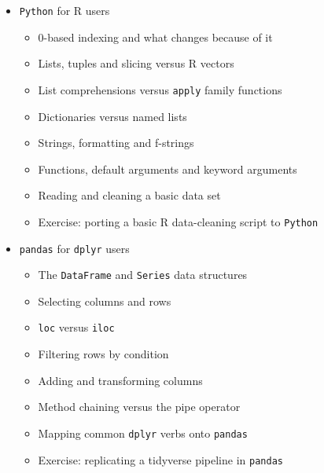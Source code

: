\documentclass[
]{article}
\providecommand{\tightlist}{%
  \setlength{\itemsep}{0pt}\setlength{\parskip}{0pt}}
\begin{document}
\begin{itemize}
\tightlist
\item
  \texttt{Python} for R users

  \begin{itemize}
  \tightlist
  \item
    0-based indexing and what changes because of it
  \item
    Lists, tuples and slicing versus R vectors
  \item
    List comprehensions versus \texttt{apply} family functions
  \item
    Dictionaries versus named lists
  \item
    Strings, formatting and f-strings
  \item
    Functions, default arguments and keyword arguments
  \item
    Reading and cleaning a basic data set
  \item
    Exercise: porting a basic R data-cleaning script to \texttt{Python}
  \end{itemize}
\end{itemize}

\begin{itemize}
\tightlist
\item
  \texttt{pandas} for \texttt{dplyr} users

  \begin{itemize}
  \tightlist
  \item
    The \texttt{DataFrame} and \texttt{Series} data structures
  \item
    Selecting columns and rows
  \item
    \texttt{loc} versus \texttt{iloc}
  \item
    Filtering rows by condition
  \item
    Adding and transforming columns
  \item
    Method chaining versus the pipe operator
  \item
    Mapping common \texttt{dplyr} verbs onto \texttt{pandas}
  \item
    Exercise: replicating a tidyverse pipeline in \texttt{pandas}
  \end{itemize}
\end{itemize}
\end{document}
